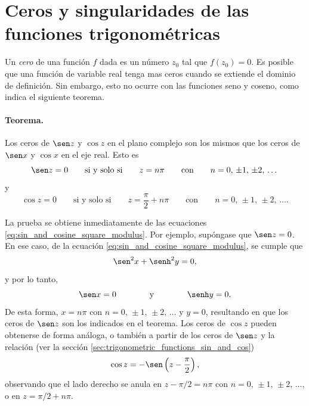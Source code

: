 \documentclass[a4paper]{report}
\begin{document}
\section{Ceros y singularidades de las funciones trigonométricas}\label{sec:zeros_singularities_trigonometric}

Un \emph{cero} de una función \(f\) dada es un número \(z_0\) tal que \(f(z_0)=0\). Es posible que una función de variable real tenga mas ceros cuando se extiende el dominio de definición. Sin embargo, esto no ocurre con las funciones seno y coseno, como indica el siguiente teorema.

\paragraph{Teorema.} Los ceros de \(\sen z\) y \(\cos z\) en el plano complejo son los mismos que los ceros de \(\sen x\) y \(\cos x\) en el eje real. Esto es
\[
 \sen z=0
 \qquad\textrm{si y solo si}\qquad
 z=n\pi
 \qquad\textrm{con}\qquad 
 n=0,\,\pm1,\,\pm2,\,\dots
\]
y
\[
 \cos z=0
 \qquad\textrm{si y solo si}\qquad
 z=\frac{\pi}{2}+n\pi
 \qquad\textrm{con}\qquad 
 n=0,\,\pm1,\,\pm2,\,\dots.
\]

La prueba se obtiene inmediatamente de las ecuaciones \ref{eq:sin_and_cosine_square_modulus}. Por ejemplo, supóngase que \(\sen z=0\). En ese caso, de la ecuación \ref{eq:sin_and_cosine_square_modulus}, se cumple que 
\[
 \sen^2x+\senh^2y=0,
\]
y por lo tanto,
\[
 \sen x=0
 \qquad\qquad\textrm{y}\qquad\qquad
 \senh y=0.
\]
De esta forma, \(x=n\pi\) con \(n=0,\,\pm1,\,\pm2,\,\dots\) y \(y=0\), resultando en que los ceros de \(\sen z\) son los indicados en el teorema. Los ceros de \(\cos z\) pueden obtenerse de forma análoga, o también a partir de los ceros de \(\sen z\) y la relación (ver la sección \ref{sec:trigonometric_functions_sin_and_cos})
\[
 \cos z=-\sen\left(z-\frac{\pi}{2}\right),
\]
observando que el lado derecho se anula en \(z-\pi/2=n\pi\) con \(n=0,\,\pm1,\,\pm2,\,\dots\), o en \(z=\pi/2+n\pi\).
\end{document}
